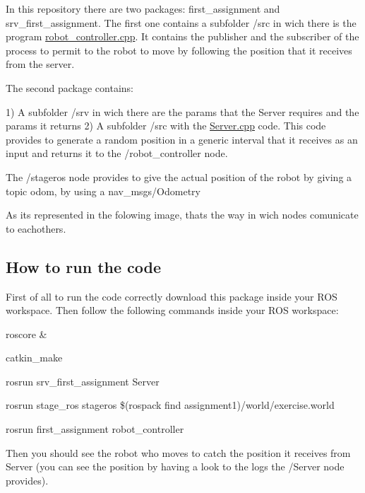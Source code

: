 In this repository there are two packages\+: first\+\_\+assignment and srv\+\_\+first\+\_\+assignment. The first one contains a subfolder /src in wich there is the program \hyperlink{robot__controller_8cpp}{robot\+\_\+controller.\+cpp}. It contains the publisher and the subscriber of the process to permit to the robot to move by following the position that it receives from the server.

The second package contains\+:

1) A subfolder /srv in wich there are the params that the Server requires and the params it returns 2) A subfolder /src with the \hyperlink{_server_8cpp}{Server.\+cpp} code. This code provides to generate a random position in a generic interval that it receives as an input and returns it to the /robot\+\_\+controller node.

The /stageros node provides to give the actual position of the robot by giving a topic odom, by using a nav\+\_\+msgs/\+Odometry

As it\textquotesingle{}s represented in the folowing image, that\textquotesingle{}s the way in wich nodes comunicate to eachothers.



\subsection*{How to run the code}

First of all to run the code correctly download this package inside your R\+OS workspace. Then follow the following commands inside your R\+OS workspace\+:


\begin{DoxyItemize}
\item roscore \&
\item catkin\+\_\+make
\item rosrun srv\+\_\+first\+\_\+assignment Server
\item rosrun stage\+\_\+ros stageros \$(rospack find assignment1)/world/exercise.world
\item rosrun first\+\_\+assignment robot\+\_\+controller
\end{DoxyItemize}

Then you should see the robot who moves to catch the position it receives from Server (you can see the position by having a look to the logs the /\+Server node provides). 